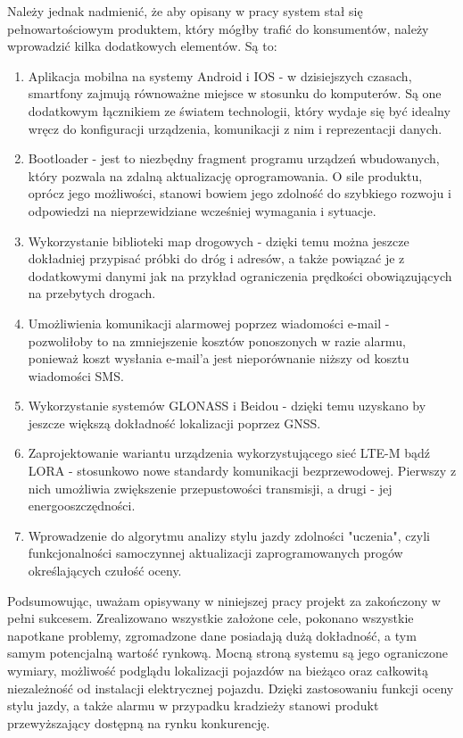 Należy jednak nadmienić, że aby opisany w pracy system stał się pełnowartościowym produktem, który mógłby trafić do konsumentów, należy wprowadzić kilka dodatkowych elementów. Są to:

\begin{enumerate}
\item Aplikacja mobilna na systemy Android i IOS - w dzisiejszych czasach, smartfony zajmują równoważne miejsce w stosunku do komputerów. Są one dodatkowym łącznikiem ze światem technologii, który wydaje się być idealny wręcz do konfiguracji urządzenia, komunikacji z nim i reprezentacji danych.
\item Bootloader - jest to niezbędny fragment programu urządzeń wbudowanych, który pozwala na zdalną aktualizację oprogramowania. O sile produktu, oprócz jego możliwości, stanowi bowiem jego zdolność do szybkiego rozwoju i odpowiedzi na nieprzewidziane wcześniej wymagania i sytuacje.
\item Wykorzystanie biblioteki map drogowych - dzięki temu można jeszcze dokładniej przypisać próbki do dróg i adresów, a także powiązać je z dodatkowymi danymi jak na przykład ograniczenia prędkości obowiązujących na przebytych drogach.
\item Umożliwienia komunikacji alarmowej poprzez wiadomości e-mail - pozwoliłoby to na zmniejszenie kosztów ponoszonych w razie alarmu, ponieważ koszt wysłania e-mail'a jest nieporównanie niższy od kosztu wiadomości SMS.
\item Wykorzystanie systemów GLONASS i Beidou - dzięki temu uzyskano by jeszcze większą dokładność lokalizacji poprzez GNSS.
\item Zaprojektowanie wariantu urządzenia wykorzystującego sieć LTE-M bądź LORA - stosunkowo nowe standardy komunikacji bezprzewodowej. Pierwszy z nich umożliwia zwiększenie przepustowości transmisji, a drugi - jej energooszczędności.
\item Wprowadzenie do algorytmu analizy stylu jazdy zdolności "uczenia", czyli funkcjonalności samoczynnej aktualizacji zaprogramowanych progów określających czułość oceny.
\end{enumerate} 

Podsumowując, uważam opisywany w niniejszej pracy projekt za zakończony w pełni sukcesem. Zrealizowano wszystkie założone cele, pokonano wszystkie napotkane problemy, zgromadzone dane posiadają dużą dokładność, a tym samym potencjalną wartość rynkową. Mocną stroną systemu są jego ograniczone wymiary, możliwość podglądu lokalizacji pojazdów na bieżąco oraz całkowitą niezależność od instalacji elektrycznej pojazdu. Dzięki zastosowaniu funkcji oceny stylu jazdy, a także alarmu w przypadku kradzieży stanowi produkt przewyższający dostępną na rynku konkurencję.